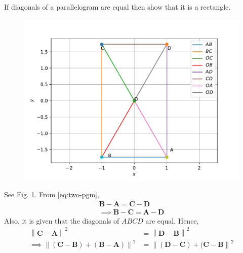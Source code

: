 \documentclass[10pt, a4paper]{article}
\providecommand{\norm}[1]{\left\lVert#1\right\rVert}
\let\vec\mathbf
\begin{document}
\title{\mytitle}
\author{\myauthor\hspace{1em}\\\contact\\FWC22008\hspace{6.5em}IITH\hspace{0.5em}\mymodule\hspace{6em}ASSIGN-4}
\date{}
	\maketitle
		
	\tableofcontents
\vspace{5mm}
\fi
If diagonals of a parallelogram are equal then show that it is a rectangle.

	\begin{figure}[!h]
		\centering
		\includegraphics[width=\columnwidth]{chapters/9/8/1/2/fig.pdf}
		\caption{}
		\label{fig:9/8/1/2}
  	\end{figure}
	\solution 
   See Fig. 
		\ref{fig:9/8/1/2}.
   From 
	  \eqref{eq:two-pgm}, 
\begin{align}
	  \label{eq:two-pgm-def} 
 \vec{B} - \vec{A}= \vec{C}-\vec{D}
 \\
\implies  \vec{B} - \vec{C}= \vec{A}-\vec{D}
	\end{align}
	Also, it is given that the diagonals of $ABCD$ are equal.  Hence, 
\begin{align}
	\norm{\vec{C} - \vec{A}}^2&= \norm{\vec{D}-\vec{B}}^2
 \\
	\implies 
	\norm{(\vec{C}-\vec{B}) + (\vec{B}-\vec{A})}^2 &= \norm{(\vec{D}-\vec{C}) + (\vec{C}-\vec{B}}^2
\end{align}
\end{document}
